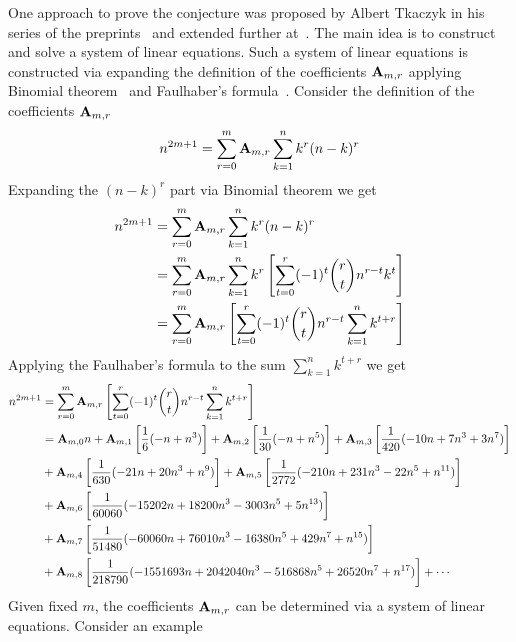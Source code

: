 One approach to prove the conjecture was proposed by Albert Tkaczyk
in his series of the preprints~\cite{tkaczyk2018problem, tkaczyk2018continuation}
and extended further at~\cite{kolosov2022106}.
The main idea is to construct and solve a system of linear equations.
Such a system of linear equations is constructed
via expanding the definition of the coefficients ${\mathbf{A}} \sb{m,r}$
applying Binomial theorem~\cite{abramowitz1988handbook} and Faulhaber's formula~\cite{beardon1996sums}.
Consider the definition of the coefficients ${\mathbf{A}} \sb{m,r}$
\begin{equation}
    n^{2m+1} = \sum_{r=0}^{m} {\mathbf{A}} \sb{m,r} \sum_{k=1}^{n} k^{r} (n-k)^{r}\label{eq:odd-power-identity}
\end{equation}
Expanding the $(n-k)^r$ part via Binomial theorem we get
\begin{equation*}
    \begin{split}
        n^{2m+1} &= \sum_{r=0}^{m} {\mathbf{A}} \sb{m,r} \sum_{k=1}^{n} k^{r} (n-k)^{r} \\
        &= \sum_{r=0}^{m} {\mathbf{A}} \sb{m,r} \sum_{k=1}^{n} k^{r} \left[ \sum_{t=0}^{r} (-1)^t \binom{r}{t} n^{r-t} k^{t} \right] \\
        &= \sum_{r=0}^{m} {\mathbf{A}} \sb{m,r} \left[ \sum_{t=0}^{r} (-1)^t \binom{r}{t} n^{r-t} \sum_{k=1}^{n} k^{t+r} \right] \\
    \end{split}
\end{equation*}
Applying the Faulhaber's formula to the sum $\sum_{k=1}^{n} k^{t+r}$ we get
\begin{equation*}
    \begin{split}
        n^{2m+1}
        &= \sum_{r=0}^{m} {\mathbf{A}} \sb{m,r} \left[ \sum_{t=0}^{r} (-1)^t \binom{r}{t} n^{r-t} \sum_{k=1}^{n} k^{t+r} \right] \\
        &= {\mathbf{A}} \sb{m,0} n
        + {\mathbf{A}} \sb{m,1} \left[ \frac{1}{6} (-n + n^3) \right]
        + {\mathbf{A}} \sb{m,2} \left[ \frac{1}{30} (-n + n^5) \right]
        + {\mathbf{A}} \sb{m,3} \left[ \frac{1}{420} (-10 n + 7 n^3 + 3 n^7) \right] \\
        &+ {\mathbf{A}} \sb{m,4} \left[ \frac{1}{630} (-21 n + 20 n^3 + n^9) \right]
        + {\mathbf{A}} \sb{m,5} \left[ \frac{1}{2772} (-210 n + 231 n^3 - 22 n^5 + n^{11}) \right] \\
        &+ {\mathbf{A}} \sb{m,6} \left[ \frac{1}{60060} (-15202 n + 18200 n^3 - 3003 n^5 + 5 n^{13}) \right] \\
        &+ {\mathbf{A}} \sb{m,7} \left[ \frac{1}{51480} (-60060 n + 76010 n^3 - 16380 n^5 + 429 n^7 + n^{15}) \right] \\
        &+ {\mathbf{A}} \sb{m,8} \left[ \frac{1}{218790} (-1551693 n + 2042040 n^3 - 516868 n^5 + 26520 n^7 + n^{17}) \right] + \cdots
    \end{split}
\end{equation*}
Given fixed $m$, the coefficients ${\mathbf{A}} \sb{m,r}$ can be determined via a system of linear equations.
Consider an example